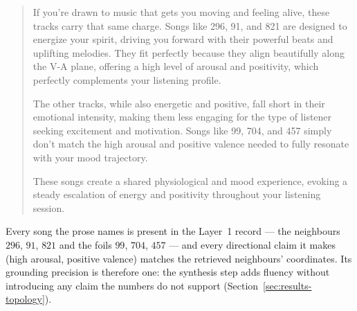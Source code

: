 \documentclass[12pt]{report}
\begin{document}
\begin{quotation}
\noindent If you're drawn to music that gets you moving and feeling alive, these tracks carry that same charge. Songs like 296, 91, and 821 are designed to energize your spirit, driving you forward with their powerful beats and uplifting melodies. They fit perfectly because they align beautifully along the V-A plane, offering a high level of arousal and positivity, which perfectly complements your listening profile.

\noindent The other tracks, while also energetic and positive, fall short in their emotional intensity, making them less engaging for the type of listener seeking excitement and motivation. Songs like 99, 704, and 457 simply don't match the high arousal and positive valence needed to fully resonate with your mood trajectory.

\noindent These songs create a shared physiological and mood experience, evoking a steady escalation of energy and positivity throughout your listening session.
\end{quotation}

\noindent Every song the prose names is present in the Layer~1 record --- the neighbours $296$, $91$, $821$ and the foils $99$, $704$, $457$ --- and every directional claim it makes (high arousal, positive valence) matches the retrieved neighbours' coordinates. Its grounding precision is therefore one: the synthesis step adds fluency without introducing any claim the numbers do not support (Section~\ref{sec:results-topology}).



%
%

\beforebibliography



\closingpage
\end{document}
